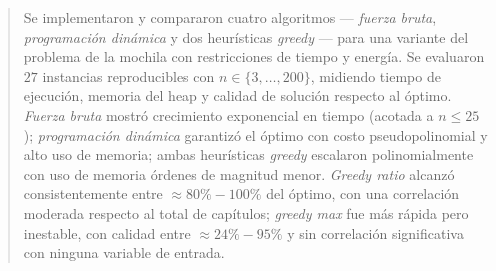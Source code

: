 \begin{abstract}
Se implementaron y compararon cuatro algoritmos --- \textit{fuerza bruta}, \textit{programación dinámica} y dos heurísticas \textit{greedy} --- para una variante del problema de la mochila con restricciones de tiempo y energía. Se evaluaron $27$ instancias reproducibles con $n \in \{3,\dots,200\}$, midiendo tiempo de ejecución, memoria del heap y calidad de solución respecto al óptimo. \textit{Fuerza bruta} mostró crecimiento exponencial en tiempo (acotada a $n\leq25$); \textit{programación dinámica} garantizó el óptimo con costo pseudopolinomial y alto uso de memoria; ambas heurísticas \textit{greedy} escalaron polinomialmente con uso de memoria órdenes de magnitud menor. \textit{Greedy ratio} alcanzó consistentemente entre $\approx 80\%-100\%$ del óptimo, con una correlación moderada respecto al total de capítulos; \textit{greedy max} fue más rápida pero inestable, con calidad entre $\approx 24\%-95\%$ y sin correlación significativa con ninguna variable de entrada.
\end{abstract}